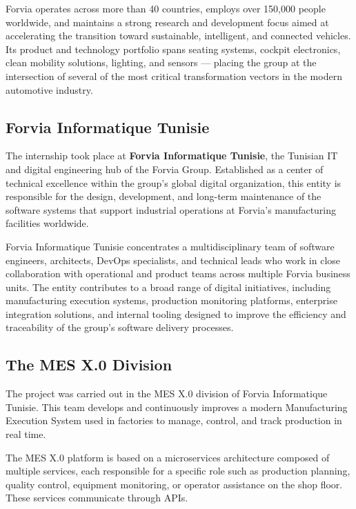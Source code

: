 Forvia operates across more than 40 countries, employs over 150,000 people
worldwide, and maintains a strong research and development focus aimed at
accelerating the transition toward sustainable, intelligent, and connected
vehicles. Its product and technology portfolio spans seating systems, cockpit
electronics, clean mobility solutions, lighting, and sensors — placing the
group at the intersection of several of the most critical transformation
vectors in the modern automotive industry.

\subsection{Forvia Informatique Tunisie}
\label{subsec:forvia-tunisie}

The internship took place at \textbf{Forvia Informatique Tunisie}, the
Tunisian IT and digital engineering hub of the Forvia Group. Established as a
center of technical excellence within the group's global digital organization,
this entity is responsible for the design, development, and long-term
maintenance of the software systems that support industrial operations at
Forvia's manufacturing facilities worldwide.

Forvia Informatique Tunisie concentrates a multidisciplinary team of software
engineers, architects, DevOps specialists, and technical leads who work in close
collaboration with operational and product teams across multiple Forvia business
units. The entity contributes to a broad range of digital initiatives, including
manufacturing execution systems, production monitoring platforms, enterprise
integration solutions, and internal tooling designed to improve the efficiency
and traceability of the group's software delivery processes.

\subsection{The MES X.0 Division}
\label{subsec:mes-division}
The project was carried out in the MES X.0 division of Forvia Informatique
Tunisie. This team develops and continuously improves a modern Manufacturing
Execution System used in factories to manage, control, and track production in
real time.

The MES X.0 platform is based on a microservices architecture composed of
multiple services, each responsible for a specific role such as production
planning, quality control, equipment monitoring, or operator assistance on the
shop floor. These services communicate through APIs.

